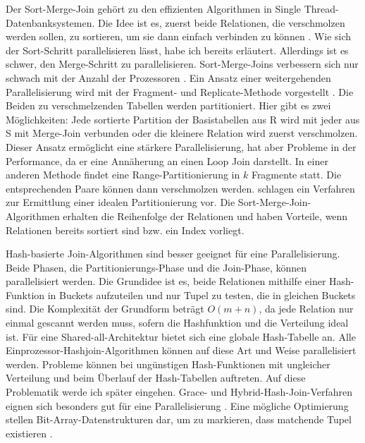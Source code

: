 \documentclass[a4paper,12pt,twoside]{article}
\begin{document}
Der Sort-Merge-Join gehört zu den effizienten Algorithmen in Single Thread-Datenbanksystemen. Die Idee ist es, zuerst beide Relationen, die verschmolzen werden sollen, zu sortieren, um sie dann einfach verbinden zu können {\autocite[S. 149]{Lu1994}}. Wie sich der Sort-Schritt parallelisieren lässt, habe ich bereits erläutert. Allerdings ist es schwer, den Merge-Schritt zu parallelisieren. Sort-Merge-Joins verbessern sich nur schwach mit der Anzahl der Prozessoren {\autocite{Yu1998}}. Ein Ansatz einer weitergehenden Parallelisierung wird mit der Fragment- und Replicate-Methode vorgestellt {\autocite {Richardson1987}}. Die Beiden zu verschmelzenden Tabellen werden partitioniert. Hier gibt es zwei Möglichkeiten: Jede sortierte Partition der Basistabellen aus R wird mit jeder aus S mit Merge-Join verbunden oder die kleinere Relation wird zuerst verschmolzen. Dieser Ansatz ermöglicht eine stärkere Parallelisierung, hat aber Probleme in der Performance, da er eine Annäherung an einen Loop Join darstellt. In einer anderen Methode findet eine Range-Partitionierung in $k$ Fragmente statt. Die entsprechenden Paare können dann verschmolzen werden. \textcite{Iyer1989} schlagen ein Verfahren zur Ermittlung einer idealen Partitionierung vor. Die Sort-Merge-Join-Algorithmen erhalten die Reihenfolge der Relationen und haben Vorteile, wenn Relationen bereits sortiert sind bzw. ein Index vorliegt.

Hash-basierte Join-Algorithmen sind besser geeignet für eine Parallelisierung. Beide Phasen, die Partitionierungs-Phase und die Join-Phase, können parallelisiert werden. Die Grundidee ist es, beide Relationen mithilfe einer Hash-Funktion in Buckets aufzuteilen und nur Tupel zu testen, die in gleichen Buckets sind. Die Komplexität der Grundform beträgt $O(m + n)$, da jede Relation nur einmal gescannt werden muss, sofern die Hashfunktion und die Verteilung ideal ist. Für eine Shared-all-Architektur bietet sich eine globale Hash-Tabelle an. Alle Einprozessor-Hashjoin-Algorithmen können auf diese Art und Weise parallelisiert werden. Probleme können bei ungünstigen Hash-Funktionen mit ungleicher Verteilung und beim Überlauf der Hash-Tabellen auftreten. Auf diese Problematik werde ich später eingehen. Grace- und Hybrid-Hash-Join-Verfahren eignen sich besonders gut für eine Parallelisierung {\autocite{DeWitt1985}}. Eine mögliche Optimierung stellen Bit-Array-Datenstrukturen dar, um zu markieren, dass matchende Tupel existieren {\autocite{Valduriez1984}}.
\end{document}
